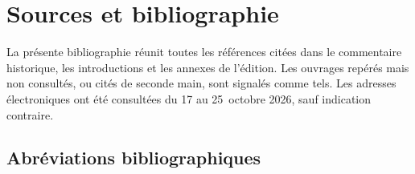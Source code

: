 \section{Sources et bibliographie}
\label{annexe-bibliographie}
\begingroup
\footnotesize
\newenvironment{biblist}{%
  \begin{list}{}{%
    \setlength{\leftmargin}{1.5em}%
    \setlength{\itemindent}{-1.5em}%
    \setlength{\labelwidth}{0pt}%
    \setlength{\labelsep}{0pt}%
    \setlength{\itemsep}{0.5pt plus 0.5pt}%
    \setlength{\parsep}{0pt}%
    \setlength{\topsep}{2pt}%
    \setlength{\partopsep}{0pt}}%
  \raggedright}{\end{list}}

La présente bibliographie réunit toutes les références citées dans le commentaire historique, les introductions et les annexes de l'édition. Les ouvrages repérés mais non consultés, ou cités de seconde main, sont signalés comme tels. Les adresses électroniques ont été consultées du 17 au 25~octobre 2026, sauf indication contraire.

\subsection*{\normalsize\upshape\bfseries Abréviations bibliographiques}

